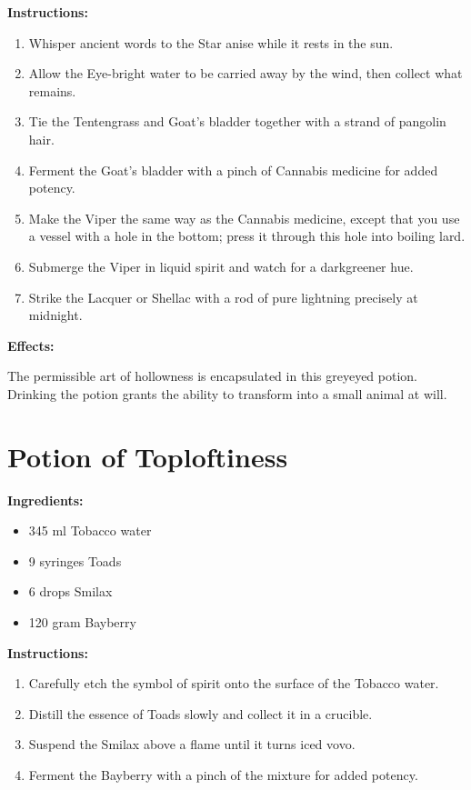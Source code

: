 \documentclass{article}
\begin{document}
\textbf{Instructions:}

\begin{enumerate}
  \item Whisper ancient words to the Star anise while it rests in the sun.
  \item Allow the Eye-bright water to be carried away by the wind, then collect what remains.
  \item Tie the Tentengrass and Goat's bladder together with a strand of pangolin hair.
  \item Ferment the Goat's bladder with a pinch of Cannabis medicine for added potency.
  \item Make the Viper the same way as the Cannabis medicine, except that you use a vessel with a hole in the bottom; press it through this hole into boiling lard.
  \item Submerge the Viper in liquid spirit and watch for a darkgreener hue.
  \item Strike the Lacquer or Shellac with a rod of pure lightning precisely at midnight.
\end{enumerate}

\textbf{Effects:}

The permissible art of hollowness is encapsulated in this greyeyed potion. Drinking the potion grants the ability to transform into a small animal at will.

\newpage
\section*{Potion of Toploftiness}

\textbf{Ingredients:}

\begin{itemize}
  \item 345 ml Tobacco water
  \item 9 syringes Toads
  \item 6 drops Smilax
  \item 120 gram Bayberry
\end{itemize}

\textbf{Instructions:}

\begin{enumerate}
  \item Carefully etch the symbol of spirit onto the surface of the Tobacco water.
  \item Distill the essence of Toads slowly and collect it in a crucible.
  \item Suspend the Smilax above a flame until it turns iced vovo.
  \item Ferment the Bayberry with a pinch of the mixture for added potency.
\end{enumerate}
\end{document}
